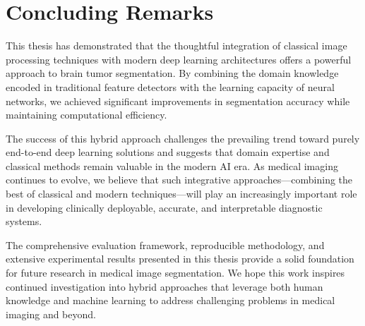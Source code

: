 \section{Concluding Remarks}

This thesis has demonstrated that the thoughtful integration of classical image processing techniques with modern deep learning architectures offers a powerful approach to brain tumor segmentation. By combining the domain knowledge encoded in traditional feature detectors with the learning capacity of neural networks, we achieved significant improvements in segmentation accuracy while maintaining computational efficiency.

The success of this hybrid approach challenges the prevailing trend toward purely end-to-end deep learning solutions and suggests that domain expertise and classical methods remain valuable in the modern AI era. As medical imaging continues to evolve, we believe that such integrative approaches—combining the best of classical and modern techniques—will play an increasingly important role in developing clinically deployable, accurate, and interpretable diagnostic systems.

The comprehensive evaluation framework, reproducible methodology, and extensive experimental results presented in this thesis provide a solid foundation for future research in medical image segmentation. We hope this work inspires continued investigation into hybrid approaches that leverage both human knowledge and machine learning to address challenging problems in medical imaging and beyond.

